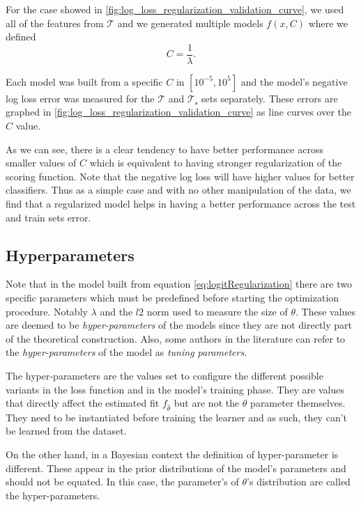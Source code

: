For the case  showed in \cref{fig:log_loss_regularization_validation_curve}, we used all of the features from $\mathcal{T}$ and we generated multiple models $f(x,C)$ where we defined
$$C = \frac{1}{\lambda} .$$

Each model was built from a specific $C$ in  $[10^{-5},10^5]$  and the model's negative log loss error was measured for the $\mathcal{T}$ and $\mathcal{T_s}$ sets separately. These errors are graphed in \cref{fig:log_loss_regularization_validation_curve} as line curves over the $C$ value.

As we can see, there is a clear tendency to have better performance across smaller values of $C$ which is equivalent to having stronger regularization of the scoring function. Note that the negative log loss will have higher values for better classifiers. Thus as a simple case and with no other manipulation of the data, we find that a regularized model helps in having a better performance across the test and train sets error.


\subsection{Hyperparameters}

Note that in the model built from equation \cref{eq:logitRegularization} there are two specific parameters which must be predefined before starting the optimization procedure. Notably $\lambda$ and the $l2$ norm used to measure the size of $\theta$. These values are deemed to be \textit{hyper-parameters} of the models since they are not directly part of the theoretical construction. Also, some authors in the literature can refer to the \textit{hyper-parameters} of the model as \textit{tuning parameters}.

The hyper-parameters are the values set to configure the different possible variants in the loss function and in the model's training phase. They are values that directly affect the estimated fit $f_{\hat{\theta}}$ but are not the $\theta$ parameter themselves. They need to be instantiated before training the learner and as such, they can't be learned from the dataset.

On the other hand, in a Bayesian context the definition of hyper-parameter is different. These appear in the prior distributions of the model's parameters and should not be equated. In this case, the parameter's of $\theta$'s distribution are called the hyper-parameters.



